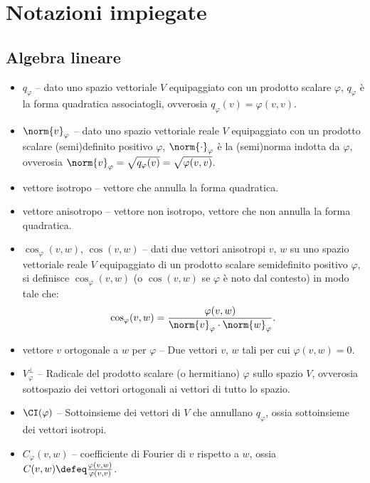 \chapter*{Notazioni impiegate}
\setlength{\parindent}{2pt}

\begin{multicols*}{2}
    \section*{Algebra lineare}

    \begin{itemize}
        \item $q_\varphi$ -- dato uno spazio vettoriale $V$ equipaggiato con un
        prodotto scalare $\varphi$, $q_\varphi$ è la forma quadratica associatogli, ovverosia
        $q_\varphi(v) = \varphi(v, v)$.
        \item $\norm{v}_{\varphi}$ -- dato uno spazio vettoriale reale $V$ equipaggiato con
        un prodotto scalare (semi)definito positivo $\varphi$, $\norm{\cdot}_{\varphi}$ è
        la (semi)norma indotta da $\varphi$, ovverosia $\norm{v}_{\varphi} = \sqrt{q_{\varphi}(v)} = \sqrt{\varphi(v, v)}$.
        \item vettore isotropo --
        vettore che annulla la forma quadratica.
        \item vettore anisotropo -- vettore non isotropo, vettore che non annulla la forma quadratica.
        \item $\cos_\varphi(v, w)$, $\cos(v, w)$ -- dati due vettori anisotropi $v$, $w$ su uno spazio vettoriale reale $V$ equipaggiato
        di un prodotto scalare semidefinito positivo $\varphi$, si definisce
        $\cos_\varphi(v, w)$ (o $\cos(v, w)$ se $\varphi$ è noto dal contesto) in modo tale che:
        \[
            \cos_\varphi(v, w) = \frac{\varphi(v, w)}{\norm{v}_\varphi \cdot \norm{w}_\varphi}.
        \]
        \item vettore $v$ ortogonale a $w$ per $\varphi$ -- Due vettori $v$, $w$ tali
        per cui $\varphi(v, w) = 0$.
        \item $V^\perp_{\varphi}$ -- Radicale del prodotto scalare (o hermitiano) $\varphi$
        sullo spazio $V$, ovverosia sottospazio dei vettori ortogonali ai vettori di tutto
        lo spazio.
        \item $\CI(\varphi)$ -- Sottoinsieme dei vettori di $V$ che annullano $q_{\varphi}$, ossia
        sottoinsieme dei vettori isotropi.
        \item $C_{\varphi}(v, w)$ -- coefficiente di Fourier di
        $v$ rispetto a $w$, ossia $C(v, w) \defeq \frac{\varphi(v, w)}{\varphi(v, v)}$.
    \end{itemize}


\end{multicols*}
